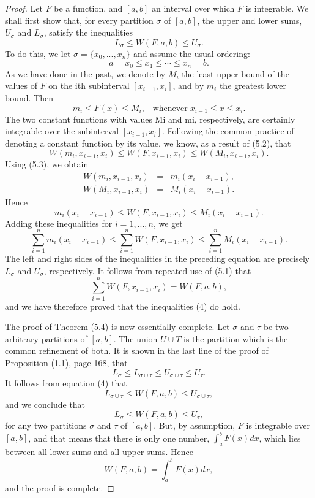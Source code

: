 \begin{proof}
Let $F$ be a function, and $[a, b]$ an interval over which $F$ is integrable. We shall first show that, for every partition $\sigma$ of $[a, b]$, the upper and lower sums, $U_\sigma$ and $L_\sigma$, satisfy the inequalities
\begin{equation}
L_\sigma \leq W(F, a, b) \leq U_\sigma.  
\label{eq8.5.4}
\end{equation}
To do this, we let $\sigma = \{x_0, ..., x_n \}$ and assume the usual ordering:
$$
a = x_0 \leq x_1 \leq \cdots \leq x_n = b.
$$
As we have done in the past, we denote by $M_i$ the least upper bound of the values of $F$ on the ith subinterval $[x_{i-1}, x_i]$, and by $m_i$ the greatest lower bound. Then
$$
m_i \leq F(x) \leq M_i, \;\;\; \mbox{whenever}\; x_{i-1} \leq x \leq x_i. 
$$
The two constant functions with values Mi and mi, respectively, are certainly integrable over the subinterval $[x_{i-1}, x_i]$. Following the common practice of denoting a constant function by its value, we know, as a result of (5.2), that 
$$
W(m_i, x_{i-1}, x_i) \leq W(F, x_{i-1}, x_i) \leq W(M_i, x_{i-1}, x_i) .
$$
Using (5.3), we obtain
\begin{eqnarray*}
W(m_i, x_{i-1}, x_i) &=& m_i(x_i - x_{i-1}), \\
W(M_i, x_{i-1}, x_i) &=& M_i(x_i - x_{i-1}). 
\end{eqnarray*}
Hence
$$
m_i(x_i - x_{i-1}) \leq W(F, x_{i -1}, x_i) \leq M_i(x_i - x_{i-1}).
$$
Adding these inequalities for $i = 1, ... , n$, we get
$$
\sum_{i=1}^n m_i(x_i - x_{i-1}) \leq \sum_{i=1}^n W(F, x_{i-1}, x_i) \leq \sum_{i=1}^n M_i(x_i - x_{i-1}).  
$$
The left and right sides of the inequalities in the preceding equation are precisely $L_\sigma$ and $U_\sigma$, respectively. It follows from repeated use of (5.1) that
$$
\sum_{i =1}^n W(F, x_{i-1}, x_i) = W(F, a, b),  
$$
and we have therefore proved that the inequalities (4) do hold.

The proof of Theorem (5.4) is now essentially complete. Let $\sigma$ and $\tau$ be two arbitrary partitions of $[a, b]$. The union $U \cup T$ is the partition which is the common refinement of both. It is shown in the last line of the proof of Proposition (1.1), page 168, that
$$
L_\sigma \leq L_{\sigma \cup \tau} \leq U_{\sigma \cup \tau} \leq U_\tau .
$$
It follows from equation (4) that
$$
L_{\sigma \cup \tau} \leq W(F, a, b) \leq U_{\sigma \cup \tau}, 
$$
and we conclude that
\begin{equation}
L_\sigma \leq W(F, a, b) \leq U_\tau, 
\label{eq8.5.5}
\end{equation}
for any two partitions $\sigma$ and $\tau$ of $[a, b]$. But, by assumption, $F$ is integrable over $[a, b]$, and that means that there is only one number, $\int_a^b F(x) dx$, which lies between all lower sums and all upper sums. Hence
$$
W(F, a, b) = \int_a^b F(x) dx, 
$$
\noindent and the proof is complete.
\end{proof}

